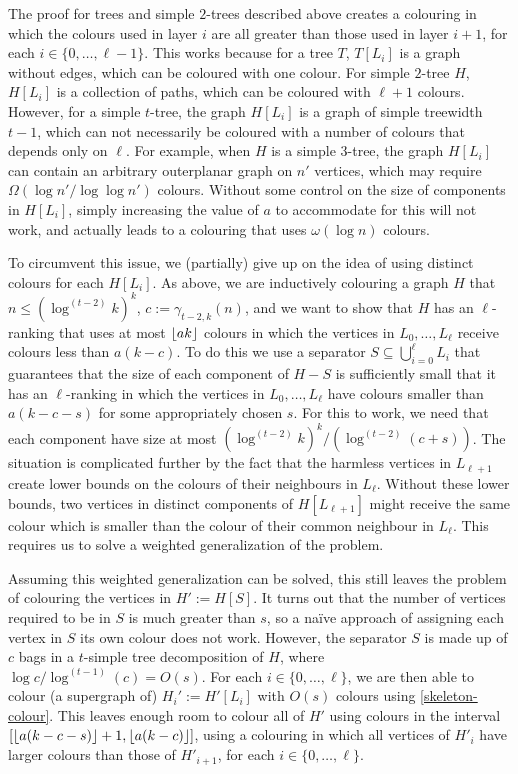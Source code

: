 \documentclass[kpfonts]{patmorin}
\theoremstyle{named}
\begin{document}
The proof for trees and simple $2$-trees described above creates a colouring in which the colours used in layer $i$ are all greater than those used in layer $i+1$, for each $i\in\{0,\ldots,\ell-1\}$.  This works because for a tree $T$, $T[L_i]$ is a graph without edges, which can be coloured with one colour.  For simple $2$-tree $H$, $H[L_i]$ is a collection of paths, which can be coloured with $\ell+1$ colours.  However, for a simple $t$-tree, the graph $H[L_i]$ is a graph of simple treewidth $t-1$, which can not necessarily be coloured with a number of colours that depends only on $\ell$.  For example, when $H$ is a simple $3$-tree, the graph $H[L_i]$ can contain an arbitrary outerplanar graph on $n'$ vertices, which may require $\Omega(\log n'/\log\log n')$ colours.  Without some control on the size of components in $H[L_i]$, simply  increasing the value of $a$ to accommodate for this will not work, and actually leads to a colouring that uses $\omega(\log n)$ colours.

To circumvent this issue, we (partially) give up on the idea of using distinct colours for each $H[L_i]$.  As above, we are inductively colouring a graph $H$ that $n\le (\log^{(t-2)} k)^k$, $c:=\gamma_{t-2,k}(n)$, and we want to show that $H$ has an $\ell$-ranking that uses at most ${\lfloor ak \rfloor}$ colours in which the vertices in $L_0,\ldots,L_{\ell}$ receive colours less than $a(k-c)$.  To do this we use a separator $S\subseteq \bigcup_{i=0}^\ell L_i$ that guarantees that the size of each component of $H-S$ is sufficiently small that it has an $\ell$-ranking in which the vertices in $L_0,\ldots,L_\ell$ have colours smaller than $a(k-c-s)$ for some appropriately chosen $s$. For this to work, we need that each component have size at most $(\log^{(t-2)} k)^k/(\log^{(t-2)}(c+s))$.  The situation is complicated further by the fact that the harmless vertices in $L_{\ell+1}$ create lower bounds on the colours of their neighbours in $L_\ell$.  Without these lower bounds, two vertices in distinct components of $H[L_{\ell+1}]$ might receive the same colour which is smaller than the colour of their common neighbour in $L_\ell$.  This requires us to solve a weighted generalization of the problem.

Assuming this weighted generalization can be solved, this still leaves the problem of colouring the vertices in $H':=H[S]$.  It turns out that the number of vertices required to be in $S$ is much greater than $s$, so a na\"ive approach of assigning each vertex in $S$ its own colour does not work.  However, the separator $S$ is made up of $c$ bags in a $t$-simple tree decomposition of $H$, where $\log c/\log^{(t-1)}(c)=O(s)$.  For each $i\in\{0,\ldots,\ell\}$, we are then able to colour (a supergraph of) $H_i':=H'[L_i]$ with $O(s)$ colours using \cref{skeleton-colour}. This leaves enough room to colour all of $H'$ using colours in the interval $[{\lfloor a(k-c-s) \rfloor}+1,{\lfloor a(k-c) \rfloor}]$, using a colouring in which all vertices of $H'_i$ have larger colours than those of $H'_{i+1}$, for each $i\in\{0,\ldots,\ell\}$.
\end{document}
